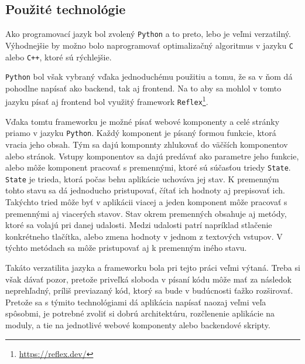 \subsection*{Použité technológie}
Ako programovací jazyk bol zvolený \texttt{Python} a to preto, lebo je veľmi verzatilný.
Výhodnejšie by možno bolo naprogramovať optimalizačný algoritmus v jazyku \texttt{C} alebo \texttt{C++}, ktoré sú rýchlejšie.

\texttt{Python} bol však vybraný vďaka jednoduchému použitiu a tomu, že sa v ňom dá pohodlne napísať ako backend, tak aj frontend.
Na to aby sa mohlol v tomto jazyku písať aj frontend bol využitý framework \texttt{Reflex}\footnote{\url{https://reflex.dev/}}.

Vďaka tomtu frameworku je možné písať webové komponenty a celé stránky priamo v jazyku \texttt{Python}.
Každý komponent je písaný formou funkcie, ktorá vracia jeho obsah.
Tým sa dajú komponnty zhlukovať do väčších komponentov alebo stránok.
Vstupy komponentov sa dajú predávať ako parametre jeho funkcie, alebo môže komponent pracovať s premennými, ktoré sú súčasťou triedy \texttt{State}.
\texttt{State} je trieda, ktorá počas behu aplikácie uchováva jej stav.
K premenným tohto stavu sa dá jednoducho pristupovať, čítať ich hodnoty aj prepisovať ich.
Takýchto tried môže byť v aplikácii viacej a jeden komponent môže pracovať s premennými aj viacerých stavov.
Stav okrem premenných obsahuje aj metódy, ktoré sa volajú pri danej udalosti.
Medzi udalosti patrí napríklad stlačenie konkrétneho tlačítka, alebo zmena hodnoty v jednom z textových vstupov.
V týchto metódach sa môže pristupovať aj k premenným iného stavu.                                                                                                             

Takáto verzatilita jazyka a frameworku bola pri tejto práci veľmi výtaná. 
Treba si však dávať pozor, pretože priveľká sloboda v písaní kódu môže mať za následok neprehľadný, príliš previazaný kód, ktorý sa bude v budúcnosti ťažko rozširovať.
Pretože sa s týmito technológiami dá aplikácia napísať naozaj veľmi veľa spôsobmi, je potrebné zvoliť si dobrú architektúru, rozčlenenie aplikácie na moduly, a tie na jednotlivé webové komponenty alebo backendové skripty.

